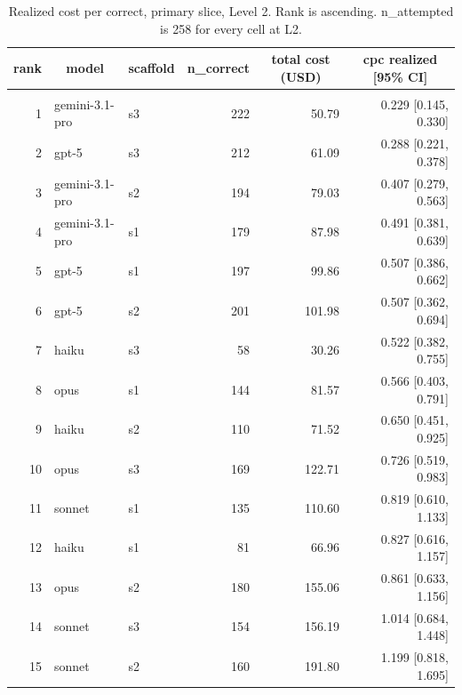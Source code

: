 \documentclass[10pt]{article} %
\begin{document}
        \begin{table}[t]
            \caption{Realized cost per correct, primary slice, Level 2. Rank is ascending. n\_attempted is 258 for every cell at L2.}
        \label{tab:cpc_primary_L2_ranked}
        \begin{center}
        \small
        \begin{tabular}{rllrrr}
            \multicolumn{1}{c}{\bf rank} & \multicolumn{1}{c}{\bf model} & \multicolumn{1}{c}{\bf scaffold} & \multicolumn{1}{c}{\bf n\_correct} & \multicolumn{1}{c}{\bf total cost (USD)} & \multicolumn{1}{c}{\bf cpc realized [95\% CI]} \\
            \hline \\
            1 & gemini-3.1-pro & s3 & 222 & 50.79 & 0.229 [0.145, 0.330] \\
            2 & gpt-5 & s3 & 212 & 61.09 & 0.288 [0.221, 0.378] \\
            3 & gemini-3.1-pro & s2 & 194 & 79.03 & 0.407 [0.279, 0.563] \\
            4 & gemini-3.1-pro & s1 & 179 & 87.98 & 0.491 [0.381, 0.639] \\
            5 & gpt-5 & s1 & 197 & 99.86 & 0.507 [0.386, 0.662] \\
            6 & gpt-5 & s2 & 201 & 101.98 & 0.507 [0.362, 0.694] \\
            7 & haiku & s3 & 58 & 30.26 & 0.522 [0.382, 0.755] \\
            8 & opus & s1 & 144 & 81.57 & 0.566 [0.403, 0.791] \\
            9 & haiku & s2 & 110 & 71.52 & 0.650 [0.451, 0.925] \\
            10 & opus & s3 & 169 & 122.71 & 0.726 [0.519, 0.983] \\
            11 & sonnet & s1 & 135 & 110.60 & 0.819 [0.610, 1.133] \\
            12 & haiku & s1 & 81 & 66.96 & 0.827 [0.616, 1.157] \\
            13 & opus & s2 & 180 & 155.06 & 0.861 [0.633, 1.156] \\
            14 & sonnet & s3 & 154 & 156.19 & 1.014 [0.684, 1.448] \\
            15 & sonnet & s2 & 160 & 191.80 & 1.199 [0.818, 1.695] \\
        \end{tabular}
        \end{center}
        \end{table}

    \FloatBarrier
\end{document}
